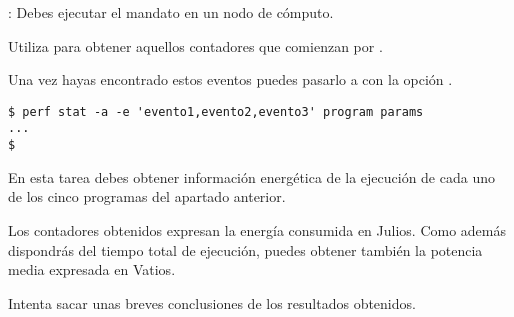 : Debes ejecutar el mandato en un nodo de cómputo.

Utiliza  para obtener aquellos contadores que comienzan 
por .

Una vez hayas encontrado estos eventos puedes pasarlo a 
con la opción .

\begin{lstlisting}[style=terminal]
$ perf stat -a -e 'evento1,evento2,evento3' program params
...
$
\end{lstlisting}

En esta tarea debes obtener información energética de la ejecución de cada uno de los
cinco programas del apartado anterior.

Los contadores obtenidos expresan la energía consumida en Julios. Como además
dispondrás del tiempo total de ejecución, puedes obtener también la potencia
media expresada en Vatios.

Intenta sacar unas breves conclusiones de los resultados obtenidos.
